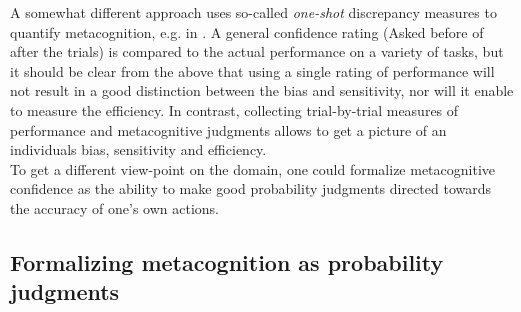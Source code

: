 \documentclass[../main/main.tex]{subfiles}
\begin{document}
	A somewhat different approach uses so-called \textit{one-shot} discrepancy measures to quantify metacognition, e.g. in \cite{kruger1999unskilled}. A general confidence rating (Asked before of after the trials) is compared to the actual performance on a variety of tasks, but it should be clear from the above that using a single rating of performance will not result in a good distinction between the bias and sensitivity, nor will it enable to measure the efficiency. In contrast, collecting trial-by-trial measures of performance and metacognitive judgments allows to get a picture of an individuals bias, sensitivity and efficiency.\\
	To get a different view-point on the domain, one could formalize metacognitive confidence as the ability to make good probability judgments directed towards the accuracy of one's own actions.
	
	\subsection{Formalizing metacognition as probability judgments}
	
\end{document}
